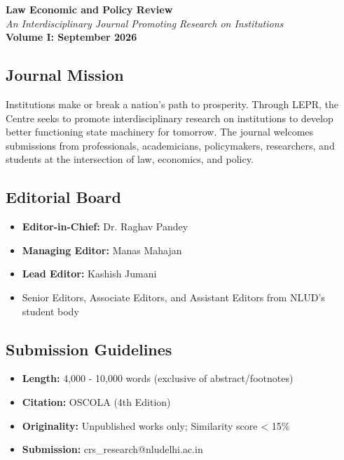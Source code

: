\documentclass[11pt,a4paper]{article}
\begin{document}
\begin{tcolorbox}[colback=ink,colframe=goldthread,coltext=vellum,arc=3mm,boxrule=2pt]
\centering
\textbf{\headingfont\Large Law Economic and Policy Review}\\[0.3cm]
\textit{An Interdisciplinary Journal Promoting Research on Institutions}\\[0.5cm]
\textbf{Volume I: September 2026}
\end{tcolorbox}

\vspace{0.5cm}

\subsection*{Journal Mission}

Institutions make or break a nation's path to prosperity. Through LEPR, the Centre seeks to promote interdisciplinary research on institutions to develop better functioning state machinery for tomorrow. The journal welcomes submissions from professionals, academicians, policymakers, researchers, and students at the intersection of law, economics, and policy.

\vspace{0.3cm}

\subsection*{Editorial Board}

\begin{itemize}[leftmargin=*,noitemsep]
    \item \textbf{Editor-in-Chief:} Dr. Raghav Pandey
    \item \textbf{Managing Editor:} Manas Mahajan
    \item \textbf{Lead Editor:} Kashish Jumani
    \item Senior Editors, Associate Editors, and Assistant Editors from NLUD's student body
\end{itemize}

\vspace{0.3cm}

\subsection*{Submission Guidelines}

\begin{itemize}[leftmargin=*,itemsep=0.1cm]
    \item \textbf{Length:} 4,000 - 10,000 words (exclusive of abstract/footnotes)
    \item \textbf{Citation:} OSCOLA (4th Edition)
    \item \textbf{Originality:} Unpublished works only; Similarity score < 15\%
    \item \textbf{Submission:} crs\_research@nludelhi.ac.in
\end{itemize}
\end{document}
